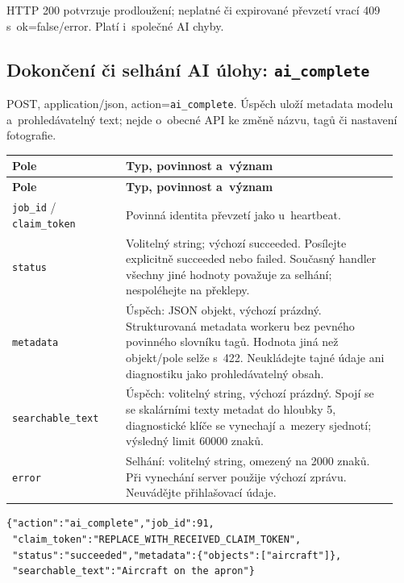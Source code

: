\documentclass[11pt,a4paper]{article}
\newcommand{\codeword}[1]{\nolinkurl{#1}}
\begin{document}
HTTP 200 potvrzuje prodloužení; neplatné či expirované převzetí vrací 409 s~ok=false/error.
Platí i~společné AI chyby.

\subsection{\texorpdfstring{Dokončení či selhání AI úlohy: \codeword{ai_complete}}{Dokončení či selhání AI úlohy: ai\_complete}}

\label{api352:ai-complete}

POST, application/json, action=\codeword{ai_complete}. Úspěch uloží metadata modelu
a~prohledávatelný text; nejde o~obecné API ke změně názvu, tagů či nastavení fotografie.

\begin{longtable}{@{}>{\RaggedRight\arraybackslash}p{0.28\linewidth}>{\RaggedRight\arraybackslash}p{0.67\linewidth}@{}}
\toprule
\textbf{Pole} & \textbf{Typ, povinnost a~význam} \\
\midrule
\endfirsthead
\toprule
\textbf{Pole} & \textbf{Typ, povinnost a~význam} \\
\midrule
\endhead
\bottomrule
\endfoot
\codeword{job_id} / \codeword{claim_token} & Povinná identita převzetí jako u~heartbeat. \\
\codeword{status} & Volitelný string; výchozí succeeded. Posílejte explicitně succeeded nebo
failed. Současný handler všechny jiné hodnoty považuje za selhání; nespoléhejte na překlepy.
\\
\codeword{metadata} & Úspěch: JSON objekt, výchozí prázdný. Strukturovaná metadata workeru
bez pevného povinného slovníku tagů. Hodnota jiná než objekt/pole selže s~422. Neukládejte
tajné údaje ani diagnostiku jako prohledávatelný obsah. \\
\codeword{searchable_text} & Úspěch: volitelný string, výchozí prázdný. Spojí se se
skalárními texty metadat do hloubky 5, diagnostické klíče se vynechají a~mezery sjednotí;
výsledný limit 60000 znaků. \\
\codeword{error} & Selhání: volitelný string, omezený na 2000 znaků. Při vynechání server
použije výchozí zprávu. Neuvádějte přihlašovací údaje. \\
\end{longtable}

\begin{lstlisting}[language={}]
{"action":"ai_complete","job_id":91,
 "claim_token":"REPLACE_WITH_RECEIVED_CLAIM_TOKEN",
 "status":"succeeded","metadata":{"objects":["aircraft"]},
 "searchable_text":"Aircraft on the apron"}
\end{lstlisting}
\end{document}
